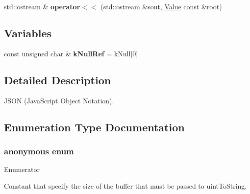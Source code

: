 \begin{DoxyCompactItemize}
\item 
std\+::ostream \& {\bfseries operator$<$$<$} (std\+::ostream \&sout, \hyperlink{class_json_1_1_value}{Value} const \&root)\hypertarget{namespace_json_af64fba09a9679b8b8cb50dd3e85f6fd5}{}\label{namespace_json_af64fba09a9679b8b8cb50dd3e85f6fd5}

\end{DoxyCompactItemize}
\subsection*{Variables}
\begin{DoxyCompactItemize}
\item 
const unsigned char \& {\bfseries k\+Null\+Ref} = k\+Null\mbox{[}0\mbox{]}\hypertarget{namespace_json_ab30055b4bbd82aecaca57ccecd63bbe6}{}\label{namespace_json_ab30055b4bbd82aecaca57ccecd63bbe6}

\end{DoxyCompactItemize}


\subsection{Detailed Description}
J\+S\+ON (Java\+Script Object Notation). 

\subsection{Enumeration Type Documentation}
\subsubsection[{\texorpdfstring{anonymous enum}{anonymous enum}}]{\setlength{\rightskip}{0pt plus 5cm}anonymous enum}\hypertarget{namespace_json_a2aacab54ef6fc18e833fbd4982a0a23a}{}\label{namespace_json_a2aacab54ef6fc18e833fbd4982a0a23a}
\begin{Desc}
\item[Enumerator]\par
\begin{description}
\item[{\em 
uint\+To\+String\+Buffer\+Size\hypertarget{namespace_json_a2aacab54ef6fc18e833fbd4982a0a23aae4f2008c7919f20d81286121d1374424}{}\label{namespace_json_a2aacab54ef6fc18e833fbd4982a0a23aae4f2008c7919f20d81286121d1374424}
}]Constant that specify the size of the buffer that must be passed to uint\+To\+String. \end{description}
\end{Desc}
